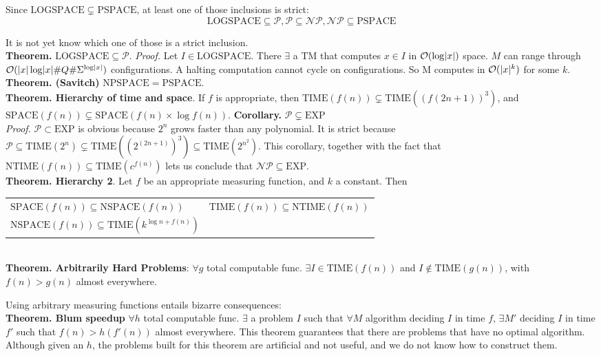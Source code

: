 \documentclass[10pt,landscape]{article}
\renewcommand{\O}{\mathcal{O}}
\renewcommand{\P}{\mathcal{P}}
\newcommand{\NP}{\mathcal{NP}}
\newcommand{\LOGSPACE}{\mathrm{LOGSPACE}}
\newcommand{\SPACE}{\mathrm{SPACE}}
\newcommand{\PSPACE}{\mathrm{PSPACE}}
\newcommand{\NSPACE}{\mathrm{NSPACE}}
\newcommand{\NPSPACE}{\mathrm{NPSPACE}}
\newcommand{\EXP}{\mathrm{EXP}}
\newcommand{\TIME}{\mathrm{TIME}}
\newcommand{\NTIME}{\mathrm{NTIME}}
\DeclarePairedDelimiter\abs{\lvert}{\rvert}
\theoremstyle{plain}%
\theoremstyle{definition}
\theoremstyle{remark}
\begin{document}
\begin{multicols}{4}
Since $\LOGSPACE \subsetneq \PSPACE$, at least one of those inclusions is strict:
\[ \LOGSPACE \subseteq \P, \P \subseteq \NP, \NP \subseteq \PSPACE \]

It is not yet know which one of those is a strict inclusion. \\[.2cm]

\textbf{Theorem. } $\LOGSPACE \subseteq \P$. \textit{Proof.}
Let $I \in \LOGSPACE$. There $\exists$ a TM that computes $x \in I$
in $\O(\log \abs{x})$ space. $M$ can range through $\O(\abs{x} \log\abs{x} \#Q \#\Sigma^{\log\abs{x}})$
configurations. A halting computation cannot cycle on configurations. So M computes in $\O(\abs{x}^k)$ for some $k$.
\\[.2cm]

\textbf{Theorem. (Savitch)} $\NPSPACE = \PSPACE$.
\\[.2cm]

\textbf{Theorem. Hierarchy of time and space}.
If $f$ is appropriate, then $\TIME(f(n)) \subsetneq \TIME((f(2n+1))^3)$, and 
$\SPACE(f(n)) \subsetneq \SPACE(f(n) \times \log f(n))$.
\textbf{Corollary. } $\P \subsetneq \EXP$\\
\textit{Proof.}
$\P \subset \EXP$ is obvious because $2^n$ grows faster than any polynomial. It is 
strict because $\P \subseteq \TIME(2^n) \subsetneq \TIME((2^{(2n+1)})^3) \subseteq \TIME(2^{n^2}) $.
This corollary, together with the fact that $\NTIME(f(n)) \subseteq \TIME(c^{f(n)})$ lets us
conclude that $\NP \subseteq \EXP$.
\\[.2cm]

\textbf{Theorem. Hierarchy 2}. Let $f$ be an appropriate measuring function, and $k$ a constant. Then
    \begin{tabular}{@{}ll@{}}
        $\SPACE(f(n)) \subseteq \NSPACE(f(n))$  & $\TIME(f(n)) \subseteq \NTIME(f(n))$ \\ 
        $\NSPACE(f(n)) \subseteq \TIME(k^{\log n + f(n)})$ & \\ 
    \end{tabular}
\\[.2cm]

\textbf{Theorem. Arbitrarily Hard Problems}: $\forall g $ total computable func. 
    $\exists I \in \TIME(f(n))$
    and $I \notin \TIME(g(n))$, with $f(n) > g(n)$ almost everywhere. 

Using arbitrary measuring functions entails bizarre consequences:
\\[.2cm]

\textbf{Theorem. Blum speedup} $\forall h$ total computable func. $\exists$ a problem $I$ 
such that $\forall M$ algorithm deciding $I$ in time $f$, $\exists M'$ deciding
$I$ in time $f'$ such that $f(n) > h(f'(n))$ almost everywhere. This theorem guarantees
that there are problems that have no optimal algorithm. Although 
given an $h$, the problems built for this theorem are artificial and not useful,
and we do not know how to construct them. \\[.2cm]


\end{multicols}
\end{document}
